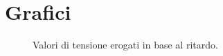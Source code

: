 \section{Grafici}
\vspace{2cm}
\begin{figure}[h]
	\centerline{}
	\centerline{} 
	\caption{Valori di tensione erogati in base al ritardo.}
	\label{time_tens}
\end{figure}
